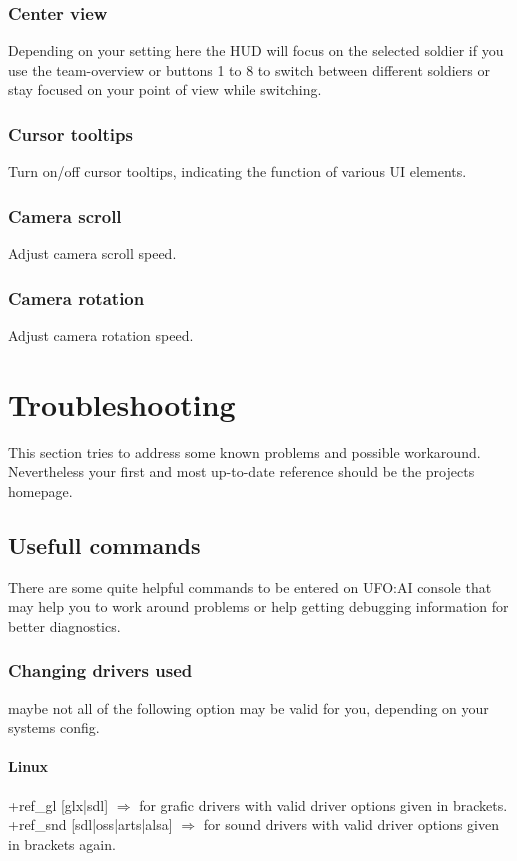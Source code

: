 \subsubsection*{Center view}
Depending on your setting here the HUD will focus on the selected soldier if you use the team-overview or buttons 1 to 8 to switch between different soldiers or stay focused on your point of view while switching.
\subsubsection*{Cursor tooltips}
Turn on/off cursor tooltips, indicating the function of various UI elements.
\subsubsection*{Camera scroll}
Adjust camera scroll  speed.
\subsubsection*{Camera rotation}
Adjust camera rotation speed.

\section{Troubleshooting}
This section tries to address some known problems and possible workaround. Nevertheless your first and most up-to-date reference should be the projects homepage.

\subsection{Usefull commands}
There are some quite helpful commands to be entered on UFO:AI console that may help you to work around problems or help getting debugging information for better diagnostics.
\subsubsection{Changing drivers used}
maybe not all of the following option may be valid for you, depending on your systems config.

\paragraph*{Linux}
+ref_gl [glx|sdl] $\Longrightarrow$ for grafic drivers with valid driver options given in brackets.
+ref_snd [sdl|oss|arts|alsa] $\Longrightarrow$ for sound drivers with valid driver options given in brackets 																						again.
